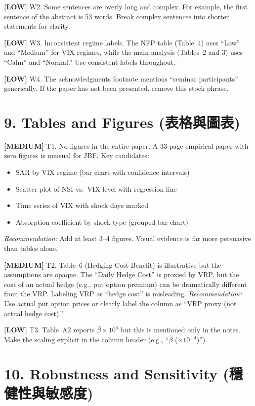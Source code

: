 \documentclass[12pt,a4paper]{article}
\newcommand{\med}[1]{\textcolor{warncolor}{\textbf{[MEDIUM]} #1}}
\newcommand{\low}[1]{\textcolor{okgreen}{\textbf{[LOW]} #1}}
\begin{document}
\low{W2. Some sentences are overly long and complex.} For example, the first sentence of the abstract is 53 words. Break complex sentences into shorter statements for clarity.

\low{W3. Inconsistent regime labels.} The NFP table (Table~4) uses ``Low'' and ``Medium'' for VIX regimes, while the main analysis (Tables~2 and 3) uses ``Calm'' and ``Normal.'' Use consistent labels throughout.

\low{W4. The acknowledgments footnote mentions ``seminar participants'' generically.} If the paper has not been presented, remove this stock phrase.

\section*{9. Tables and Figures (表格與圖表)}

\med{T1. No figures in the entire paper.} A 33-page empirical paper with zero figures is unusual for JBF. Key candidates:
\begin{itemize}[nosep]
\item SAR by VIX regime (bar chart with confidence intervals)
\item Scatter plot of NSI vs.\ VIX level with regression line
\item Time series of VIX with shock days marked
\item Absorption coefficient by shock type (grouped bar chart)
\end{itemize}
\emph{Recommendation:} Add at least 3--4 figures. Visual evidence is far more persuasive than tables alone.

\med{T2. Table~6 (Hedging Cost-Benefit) is illustrative but the assumptions are opaque.} The ``Daily Hedge Cost'' is proxied by VRP, but the cost of an actual hedge (e.g., put option premium) can be dramatically different from the VRP. Labeling VRP as ``hedge cost'' is misleading. \emph{Recommendation:} Use actual put option prices or clearly label the column as ``VRP proxy (not actual hedge cost).''

\low{T3. Table~A2 reports $\hat{\beta} \times 10^4$ but this is mentioned only in the notes.} Make the scaling explicit in the column header (e.g., ``$\hat{\beta}$ ($\times 10^{-4}$)'').

\section*{10. Robustness and Sensitivity (穩健性與敏感度)}
\end{document}
